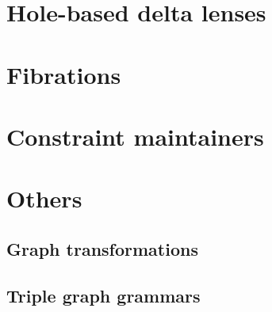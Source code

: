 \section{Hole-based delta lenses}
\label{sec:holes}
%

\section{Fibrations}
\label{sec:fibrations}
%

\section{Constraint maintainers}
\label{sec:constraint-maintainers}
%

\section{Others}
\label{sec:other-related-work}

\subsection{Graph transformations}
\label{sec:other-related-work:graph}

\subsection{Triple graph grammars}
\label{sec:other-related-work:triple}

